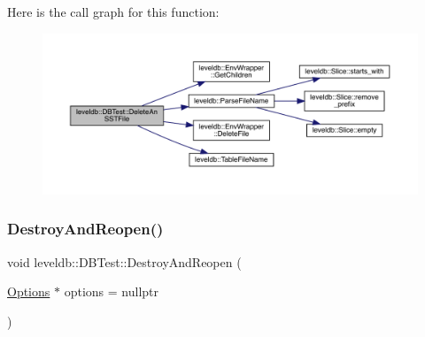 Here is the call graph for this function\+:
\nopagebreak
\begin{figure}[H]
\begin{center}
\leavevmode
\includegraphics[width=350pt]{classleveldb_1_1_d_b_test_abcb2ebeb0733670d7634079c587426d2_cgraph}
\end{center}
\end{figure}
\mbox{\label{classleveldb_1_1_d_b_test_a3ccf08a024e805e70b723887e6dbfdae}} 
\subsubsection{\texorpdfstring{DestroyAndReopen()}{DestroyAndReopen()}}
{\footnotesize\ttfamily void leveldb\+::\+D\+B\+Test\+::\+Destroy\+And\+Reopen (\begin{DoxyParamCaption}\item[{\mbox{\hyperlink{structleveldb_1_1_options}{Options}} $\ast$}]{options = {\ttfamily nullptr} }\end{DoxyParamCaption})\hspace{0.3cm}{\ttfamily [inline]}}

